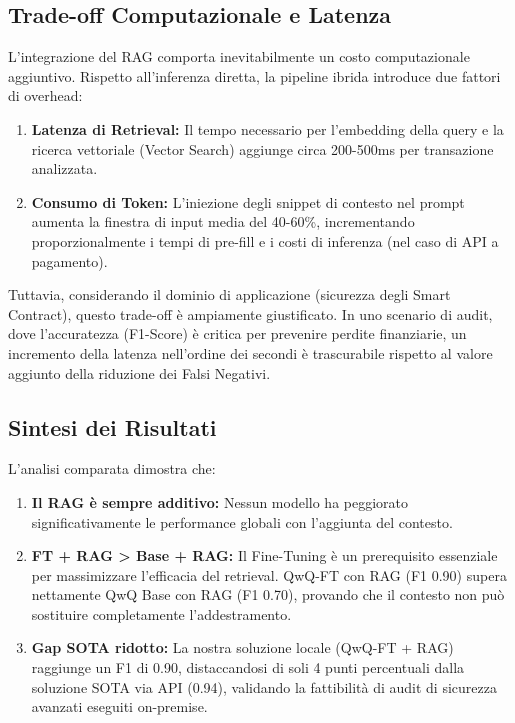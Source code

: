 \subsection{Trade-off Computazionale e Latenza}
L'integrazione del RAG comporta inevitabilmente un costo computazionale aggiuntivo. Rispetto all'inferenza diretta, la pipeline ibrida introduce due fattori di overhead:
\begin{enumerate}
    \item \textbf{Latenza di Retrieval:} Il tempo necessario per l'embedding della query e la ricerca vettoriale (Vector Search) aggiunge circa 200-500ms per transazione analizzata.
    \item \textbf{Consumo di Token:} L'iniezione degli snippet di contesto nel prompt aumenta la finestra di input media del 40-60\%, incrementando proporzionalmente i tempi di pre-fill e i costi di inferenza (nel caso di API a pagamento).
\end{enumerate}
Tuttavia, considerando il dominio di applicazione (sicurezza degli Smart Contract), questo trade-off è ampiamente giustificato. In uno scenario di audit, dove l'accuratezza (F1-Score) è critica per prevenire perdite finanziarie, un incremento della latenza nell'ordine dei secondi è trascurabile rispetto al valore aggiunto della riduzione dei Falsi Negativi.

\subsection{Sintesi dei Risultati}
L'analisi comparata dimostra che:
\begin{enumerate}
    \item \textbf{Il RAG è sempre additivo:} Nessun modello ha peggiorato significativamente le performance globali con l'aggiunta del contesto.
    \item \textbf{FT + RAG > Base + RAG:} Il Fine-Tuning è un prerequisito essenziale per massimizzare l'efficacia del retrieval. QwQ-FT con RAG (F1 0.90) supera nettamente QwQ Base con RAG (F1 0.70), provando che il contesto non può sostituire completamente l'addestramento.
    \item \textbf{Gap SOTA ridotto:} La nostra soluzione locale (QwQ-FT + RAG) raggiunge un F1 di 0.90, distaccandosi di soli 4 punti percentuali dalla soluzione SOTA via API (0.94), validando la fattibilità di audit di sicurezza avanzati eseguiti on-premise.
\end{enumerate}